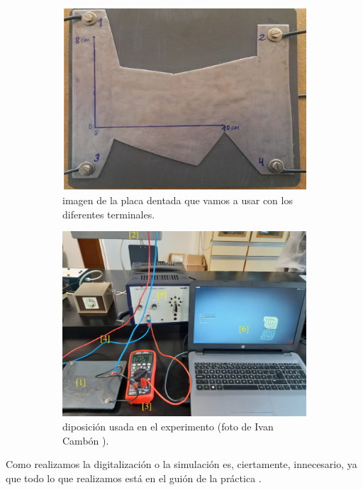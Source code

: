 \documentclass[11pt]{article}
\begin{document}
\begin{figure}[h!] \centering
\begin{subfigure}{0.45\linewidth}\centering
	\includegraphics[width=0.9\linewidth]{Agros/placa prueba.png}
	\caption{imagen de la placa dentada que vamos a usar con los diferentes terminales.}
	\label{Fig:01}
\end{subfigure}
\begin{subfigure}{0.45\linewidth} \centering
	\includegraphics[width=0.9\linewidth]{Agros/Disposicion.png}
	\caption{diposición usada en el experimento (foto de Ivan Cambón \cite{IvanCambon}).}
	\label{Fig:02}
\end{subfigure}
\caption{}
\end{figure}

Como realizamos la digitalización o la simulación es, ciertamente, innecesario, ya que todo lo que realizamos está en el guión de la práctica \cite{Guion}.
\end{document}
